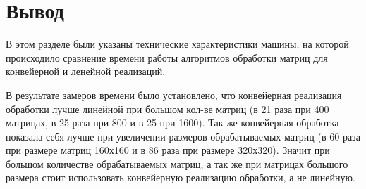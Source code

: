 \section*{Вывод}

В этом разделе были указаны технические характеристики машины, на которой происходило сравнение времени работы алгоритмов обработки матриц для конвейерной и ленейной реализаций.

В результате замеров времени было установлено, что конвейерная реализация обработки лучше линейной
при большом кол-ве матриц (в 21 раза при 400 матрицах, в 25 раза при 800 и в 25 при 1600). Так же конвейерная обработка показала себя лучше при увеличении размеров обрабатываемых матриц (в 60 раза при размере матриц 160х160 и в 86 раза при размере 320х320). Значит при большом количестве обрабатываемых матриц, а так же при матрицах большого размера стоит использовать конвейерную реализацию обработки, а не линейную.





